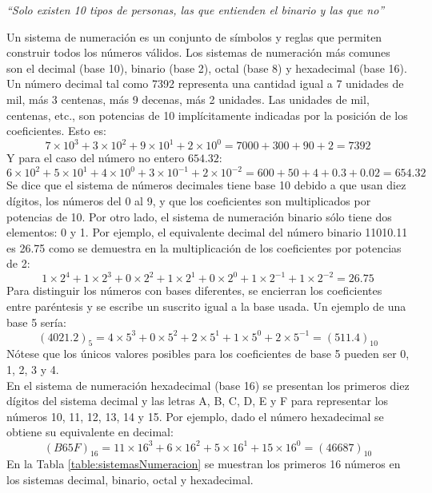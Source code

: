 \begin{center}
  \textit{“Solo existen 10 tipos de personas, las que entienden el binario y las que no”} 
\end{center}
Un sistema de numeración es un conjunto de símbolos y reglas que permiten construir todos los números válidos. Los sistemas de numeración más comunes son el decimal (base 10), 
binario (base 2), octal (base 8) y hexadecimal (base 16).\\
Un número decimal tal como 7392 representa una cantidad igual a 7 unidades de mil, más 3 centenas, más 9 decenas, más 2 unidades. Las unidades de mil, centenas, etc., son potencias 
de 10 implícitamente indicadas por la posición de los coeficientes. Esto es:
$$7 \times 10^{3} + 3 \times 10^{2} + 9 \times 10^{1} + 2 \times 10^{0} = 7000 + 300 + 90 + 2 = 7392$$
Y para el caso del número no entero $654.32$:
$$6 \times 10^{2} + 5 \times 10^{1} + 4 \times 10^{0} + 3 \times 10^{-1}+ 2 \times 10^{-2} = 600 + 50 + 4 + 0.3 + 0.02 = 654.32$$
Se dice que el sistema de números decimales tiene base 10 debido a que usan diez dígitos, los números del 0 al 9, y que los coeficientes son multiplicados por potencias de 10. 
Por otro lado, el sistema de numeración binario sólo tiene dos elementos: 0 y 1. Por ejemplo, el equivalente decimal del número binario 11010.11 es 26.75 como se demuestra en la 
multiplicación de los coeficientes por potencias de 2:
$$1 \times 2^{4} + 1 \times 2^{3} + 0 \times 2^{2} + 1 \times 2^{1} + 0 \times 2^{0} + 1 \times 2^{-1} + 1 \times 2^{-2} = 26.75$$
Para distinguir los números con bases diferentes, se encierran los coeficientes entre paréntesis y se escribe un suscrito igual a la base usada. Un ejemplo de una base 5 sería:
$$(4021.2)_{5} = 4 \times 5^{3} + 0 \times 5^{2} + 2 \times 5^{1} + 1 \times 5^{0} + 2 \times 5^{-1} = (511.4)_{10}$$
Nótese que los únicos valores posibles para los coeficientes de base 5 pueden ser 0, 1, 2, 3 y 4.\\
En el sistema de numeración hexadecimal (base 16) se presentan los primeros diez dígitos del sistema decimal y las letras A, B, C, D, E y F para representar los números 
10, 11, 12, 13, 14 y 15. Por ejemplo, dado el número hexadecimal se obtiene su equivalente en decimal:
$$(B65F)_{16} = 11 \times 16^{3} + 6 \times 16^{2} + 5 \times 16^{1} + 15 \times 16^{0} = (46687)_{10}$$
En la Tabla \ref{table:sistemasNumeracion} se muestran los primeros 16 números en los sistemas decimal, binario, octal y hexadecimal.


